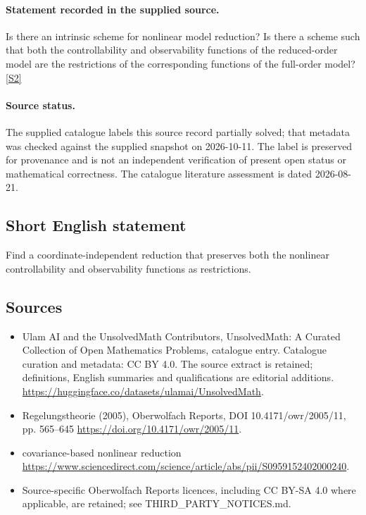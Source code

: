 \documentclass[11pt]{article}
\begin{document}
\paragraph{Statement recorded in the supplied source.}
Is there an intrinsic scheme for nonlinear model reduction? Is there a scheme such that both the controllability and observability functions of the reduced-order model are the restrictions of the corresponding functions of the full-order model? \href{https://doi.org/10.4171/owr/2005/11}{[S2]}
\paragraph{Source status.}
The supplied catalogue labels this source record partially solved; that metadata was checked against the supplied snapshot on 2026-10-11. The label is preserved for provenance and is not an independent verification of present open status or mathematical correctness. The catalogue literature assessment is dated 2026-08-21.
\subsection{Short English statement}
Find a coordinate-independent reduction that preserves both the nonlinear controllability and observability functions as restrictions.
\subsection{Sources}
\begin{itemize}
\item[S1] Ulam AI and the UnsolvedMath Contributors, UnsolvedMath: A Curated Collection of Open Mathematics Problems, catalogue entry. Catalogue curation and metadata: CC BY 4.0. The source extract is retained; definitions, English summaries and qualifications are editorial additions.
\url{https://huggingface.co/datasets/ulamai/UnsolvedMath}.
\item[S2] Regelungstheorie (2005), Oberwolfach Reports, DOI 10.4171/owr/2005/11, pp. 565--645
\url{https://doi.org/10.4171/owr/2005/11}.
\item[S3] covariance-based nonlinear reduction
\url{https://www.sciencedirect.com/science/article/abs/pii/S0959152402000240}.
\item Source-specific Oberwolfach Reports licences, including CC BY-SA 4.0 where applicable, are retained; see THIRD\_PARTY\_NOTICES.md.
\end{itemize}
\end{document}
